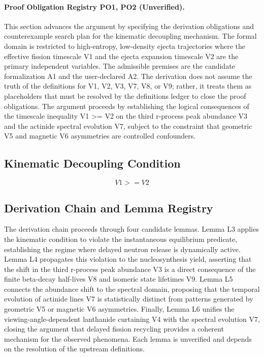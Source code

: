 \documentclass[conference]{IEEEtran}
\begin{document}
\paragraph{Proof Obligation Registry PO1, PO2 (Unverified).} This section advances the argument by specifying the derivation obligations and counterexample search plan for the kinematic decoupling mechanism. The formal domain is restricted to high-entropy, low-density ejecta trajectories where the effective fission timescale V1 and the ejecta expansion timescale V2 are the primary independent variables. The admissible premises are the candidate formalization A1 and the user-declared A2. The derivation does not assume the truth of the definitions for V1, V2, V3, V7, V8, or V9; rather, it treats them as placeholders that must be resolved by the definitions ledger to close the proof obligations. The argument proceeds by establishing the logical consequences of the timescale inequality V1 >= V2 on the third r-process peak abundance V3 and the actinide spectral evolution V7, subject to the constraint that geometric V5 and magnetic V6 asymmetries are controlled confounders.

\subsection{Kinematic Decoupling Condition}
\begin{equation}
V1 >= V2
\label{eq:forward-derivation-and-counterexamples-b2}
\end{equation}

\subsection{Derivation Chain and Lemma Registry}
The derivation chain proceeds through four candidate lemmas. Lemma L3 applies the kinematic condition to violate the instantaneous equilibrium predicate, establishing the regime where delayed neutron release is dynamically active. Lemma L4 propagates this violation to the nucleosynthesis yield, asserting that the shift in the third r-process peak abundance V3 is a direct consequence of the finite beta-decay half-lives V8 and isomeric state lifetimes V9. Lemma L5 connects the abundance shift to the spectral domain, proposing that the temporal evolution of actinide lines V7 is statistically distinct from patterns generated by geometric V5 or magnetic V6 asymmetries. Finally, Lemma L6 unifies the viewing-angle-dependent lanthanide curtaining V4 with the spectral evolution V7, closing the argument that delayed fission recycling provides a coherent mechanism for the observed phenomena. Each lemma is unverified and depends on the resolution of the upstream definitions.
\end{document}
